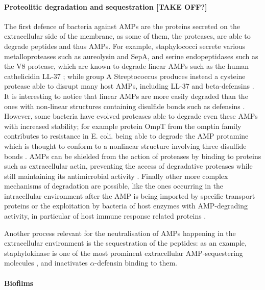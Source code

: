 \paragraph{Proteolitic degradation and sequestration [TAKE OFF?]}
The first defence of bacteria against AMPs are the proteins secreted on the extracellular side of the membrane, as some of them, the proteases, are able to degrade peptides and thus AMPs.
%
For example, staphylococci secrete various metalloproteases such as aureolysin and SepA, and serine endopeptidases such as the V8 protease, which are known to degrade linear AMPs such as the human cathelicidin LL-37 \cite{Sieprawska-Lupa2004,Teufel1993}; while group A Streptococcus produces instead a cysteine protease able to disrupt many host AMPs, including LL-37 and beta-defensins \cite{Schmidtchen2002,Baranska-Rybak2006,Nelson2011,Frick2011}. It is interesting to notice that linear AMPs are more easily degraded than the ones with non-linear structures containing disulfide bonds\cite{Peschel2006} such as defensins \cite{Selsted1989}.
However, some bacteria have evolved proteases able to  degrade even these AMPs with increased stability; for example protein OmpT from the omptin family contributes to resistance in E. coli. being able to degrade the AMP protamine \cite{Stumpe1998}
which is thought to conform to a nonlinear structure involving three disulfide bonds \cite{Biegeleisen2006}.
AMPs can be shielded from the action of proteases by binding to proteins such as extracellular actin, preventing the access of degradative proteases while  still maintaining its antimicrobial activity \cite{Sol2014}.
Finally other more complex mechanisms of degradation are possible, like the ones occurring in the intracellular environment after the AMP is being imported by specific transport proteins \cite{Groisman1992,Parra-Lopez1993,Mason2005} or the exploitation by bacteria of host enzymes with AMP-degrading activity, in particular  of host immune response related proteins \cite{Taggart2003}.

Another process relevant for the neutralisation of AMPs happening in the extracellular environment is the sequestration of the peptides: as an example, staphylokinase is one of the most prominent extracellular AMP-sequestering molecules \cite{Bokarewa2004,Jin2004}, and inactivates $\alpha$-defensin binding to them.


\paragraph{Biofilms}

